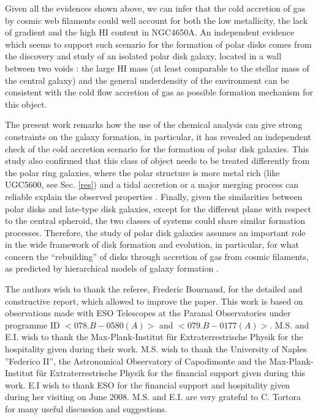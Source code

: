 \documentclass[12pt,preprint]{aastex}
\begin{document}
Given all the evidences shown above, we can infer that the cold
  accretion of gas by cosmic web filaments could well account for both
  the low metallicity, the lack of gradient and the high HI content in
  NGC4650A. An independent evidence which seems to support such
  scenario for the formation of polar disks comes from the discovery
  and study of an isolated polar disk galaxy, located in a wall
  between two voids \citep{Sta09}: the large HI mass (at least
  comparable to the stellar mass of the central galaxy) and the
  general underdensity of the environment can be consistent with the
  cold flow accretion of gas as possible formation mechanism for this
  object.


The present work remarks how the use of the chemical analysis can give
strong constraints on the galaxy formation, in particular, it has
revealed an independent check of the cold accretion scenario for the
formation of polar disk galaxies. This study also confirmed that this
class of object needs to be treated differently from the polar ring
galaxies, where the polar structure is more metal rich (like UGC5600,
see Sec. \ref{res}) and a tidal accretion or a major merging process
can reliable explain the observed properties \citep{Bou03}.
Finally, given the similarities between polar disks and
late-type disk galaxies, except for the different plane with respect
to the central spheroid, the two classes of systems could share similar
formation processes. Therefore, the study of polar disk galaxies assumes
an important role in the wide framework of disk formation and
evolution, in particular, for what concern the ``rebuilding'' of disks
through accretion of gas from cosmic filaments, as predicted by
hierarchical models of galaxy formation \citep{Ste02}.





\acknowledgments

The authors wish to thank the referee, Frederic Bournaud, for the
detailed and constructive report, which allowed to improve the
paper. This work is based on observations made with ESO Telescopes at
the Paranal Observatories under programme ID $<078.B-0580(A)>$ and
$<079.B-0177(A)>$. M.S. and E.I. wish to thank the Max-Plank-Institut
f\"{u}r Extraterrestrische Physik for the hospitality given during
their work. M.S. wish to thank the University of Naples ''Federico
II'', the Astronomical Observatory of Capodimonte and the
Max-Plank-Institut f\"{u}r Extraterrestrische Physik for the financial
support given during this work. E.I wish to thank ESO for the
financial support and hospitality given during her visiting on June
2008. M.S. and E.I. are very grateful to C. Tortora for many useful
discussion and suggestions.
\end{document}

